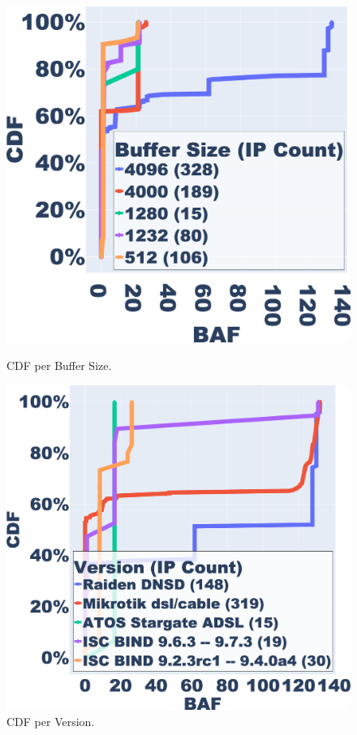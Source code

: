 \captionsetup{font=small}
\begin{figure}[t]
    \centering
    \begin{minipage}[b]{0.2385\textwidth}
        \centering
        \includegraphics[width=\textwidth]{research paper/plots/SL_buffer_size_cdf_trim.png}
        \caption{CDF per Buffer Size.}
        \label{fig:cdf_buffer_size}
    \end{minipage}
    \begin{minipage}[b]{0.2385\textwidth}
        \centering
        \includegraphics[width=\textwidth]{research paper/plots/SL_version_cdf_trim.png}
        \caption{CDF per Version.}
        \label{fig:cdf_version}
    \end{minipage}
\end{figure}

